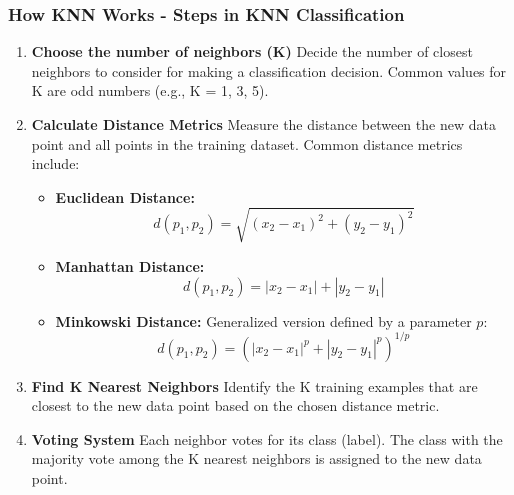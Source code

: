 \documentclass[aspectratio=169]{beamer}
\begin{document}
\begin{frame}[fragile]
    \frametitle{How KNN Works - Steps in KNN Classification}
    \begin{enumerate}
        \item \textbf{Choose the number of neighbors (K)}  
        Decide the number of closest neighbors to consider for making a classification decision. Common values for K are odd numbers (e.g., K = 1, 3, 5).
        
        \item \textbf{Calculate Distance Metrics}  
        Measure the distance between the new data point and all points in the training dataset. Common distance metrics include:
        \begin{itemize}
            \item \textbf{Euclidean Distance:}  
            \begin{equation}
                d(p_1, p_2) = \sqrt{(x_2 - x_1)^2 + (y_2 - y_1)^2}
            \end{equation}
            \item \textbf{Manhattan Distance:}
            \begin{equation}
                d(p_1, p_2) = |x_2 - x_1| + |y_2 - y_1|
            \end{equation}
            \item \textbf{Minkowski Distance:}  
            Generalized version defined by a parameter \( p \):
            \begin{equation}
                d(p_1, p_2) = (|x_2 - x_1|^p + |y_2 - y_1|^p)^{1/p}
            \end{equation}
        \end{itemize}

        \item \textbf{Find K Nearest Neighbors}  
        Identify the K training examples that are closest to the new data point based on the chosen distance metric.
        
        \item \textbf{Voting System}  
        Each neighbor votes for its class (label). The class with the majority vote among the K nearest neighbors is assigned to the new data point.
    \end{enumerate}
\end{frame}
\end{document}

